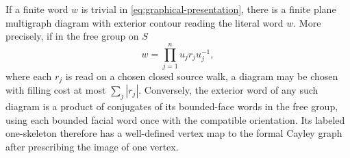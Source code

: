 \begin{lemma}\label{lem:word-diagram}
If a finite word $w$ is trivial in \eqref{eq:graphical-presentation}, there
is a finite plane multigraph diagram with exterior contour reading the
literal word $w$.  More precisely, if in the free group on $S$
\[
 w=\prod_{j=1}^n u_jr_ju_j^{-1},
\]
where each $r_j$ is read on a chosen closed source walk, a diagram may be
chosen with filling cost at most $\sum_j|r_j|$.
Conversely, the exterior word of any such diagram is a product of
conjugates of its bounded-face words in the free group, using each
bounded facial word once with the compatible orientation.  Its labeled
one-skeleton therefore has a well-defined vertex map to the formal Cayley
graph after prescribing the image of one vertex.
\end{lemma}

